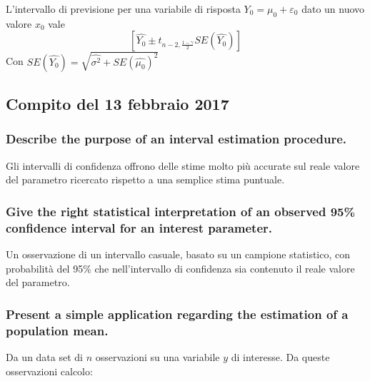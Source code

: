 \documentclass[
]{article}
\begin{document}
L'intervallo di previsione per una variabile di risposta
\(Y_0 = \mu_0 + \varepsilon_0\) dato un nuovo valore \(x_0\) vale
\[ \left[ \hat{Y_0} \pm t_{n-2,\frac{1-\gamma}{2}}SE(\hat{Y_0}) \right] \]
Con \(SE(\hat{Y_0}) = \sqrt{\hat{\sigma^2} + SE(\hat{\mu_0})^2}\)

\hypertarget{compito-del-13-febbraio-2017}{%
\subsection{Compito del 13 febbraio
2017}\label{compito-del-13-febbraio-2017}}

\hypertarget{describe-the-purpose-of-an-interval-estimation-procedure.}{%
\subsubsection{Describe the purpose of an interval estimation
procedure.}\label{describe-the-purpose-of-an-interval-estimation-procedure.}}

Gli intervalli di confidenza offrono delle stime molto più accurate sul
reale valore del parametro ricercato rispetto a una semplice stima
puntuale.

\hypertarget{give-the-right-statistical-interpretation-of-an-observed-95-confidence-interval-for-an-interest-parameter.}{%
\subsubsection{Give the right statistical interpretation of an observed
95\% confidence interval for an interest
parameter.}\label{give-the-right-statistical-interpretation-of-an-observed-95-confidence-interval-for-an-interest-parameter.}}

Un osservazione di un intervallo casuale, basato su un campione
statistico, con probabilità del 95\% che nell'intervallo di confidenza
sia contenuto il reale valore del parametro.

\hypertarget{present-a-simple-application-regarding-the-estimation-of-a-population-mean.}{%
\subsubsection{Present a simple application regarding the estimation of
a population
mean.}\label{present-a-simple-application-regarding-the-estimation-of-a-population-mean.}}

Da un data set di \(n\) osservazioni su una variabile \(y\) di
interesse. Da queste osservazioni calcolo:
\end{document}

